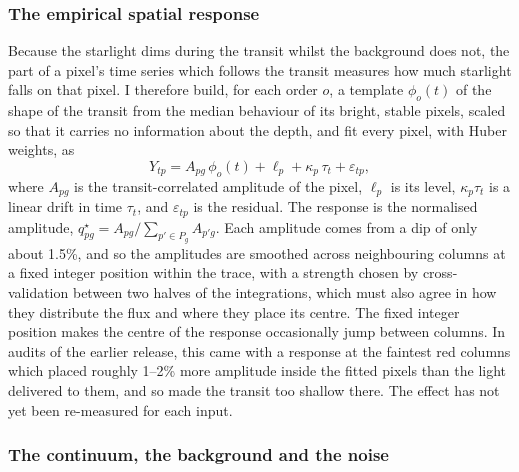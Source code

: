 \subsubsection{The empirical spatial response}

Because the starlight dims during the transit whilst the background does
not, the part of a pixel's time series which follows the transit measures how
much starlight falls on that pixel. I therefore build, for each order $o$, a
template $\phi_o(t)$ of the shape of the transit from the median behaviour of
its bright, stable pixels, scaled so that it carries no information about the
depth, and fit every pixel, with Huber weights, as
\begin{equation}
 Y_{tp} = A_{pg}\,\phi_{o}(t) + \ell_p + \kappa_p\,\tau_t + \varepsilon_{tp},
 \label{eq:qstar-fit}
\end{equation}
where $A_{pg}$ is the transit-correlated amplitude of the pixel, $\ell_p$ is
its level, $\kappa_p\tau_t$ is a linear drift in time $\tau_t$, and
$\varepsilon_{tp}$ is the residual. The response is the normalised amplitude,
$q^\star_{pg}=A_{pg}/\sum_{p'\in P_g}A_{p'g}$. Each amplitude comes from a dip of only
about 1.5\%, and so the amplitudes are smoothed across neighbouring columns at
a fixed integer position within the trace, with a strength chosen by
cross-validation between two halves of the integrations, which must also
agree in how they distribute the flux and where they place its centre. The
fixed integer position makes the centre of the response occasionally jump
between columns. In audits of the earlier release, this came with a response
at the faintest red columns which placed roughly 1--2\% more amplitude inside
the fitted pixels than the light delivered to them, and so made the transit
too shallow there. The effect has not yet been re-measured for each input.

\subsubsection{The continuum, the background and the noise}

